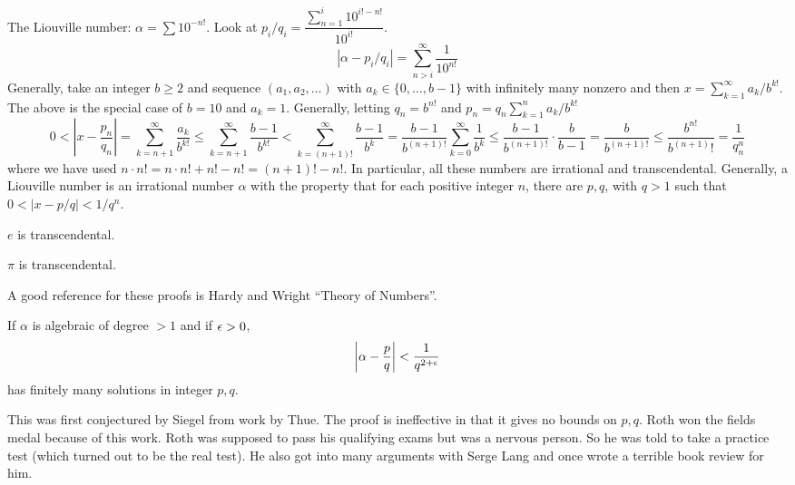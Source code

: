 \begin{ex}
The Liouville number: $\alpha= \sum 10^{-n!}$. Look at $p_i/q_i=\dfrac{\sum_{n=1}^i 10^{i!-n!}}{10^{i!}}$. 
	\[
	|\alpha - p_i/q_i| = \sum_{n>i}^\infty \dfrac{1}{10^{n!}} 
	\]
Generally, take an integer $b \geq 2$ and sequence $(a_1,a_2,\ldots)$ with $a_k \in \{0,\ldots,b-1\}$ with infinitely many nonzero and then $x= \sum_{k=1}^\infty a_k/b^{k!}$. The above is the special case of $b=10$ and $a_k=1$. Generally, letting $q_n=b^{n!}$ and $p_n=q_n \sum_{k=1}^n a_k/b^{k!}$
	\[
	0<\left| x- \dfrac{p_n}{q_n}\right| = \sum_{k=n+1}^\infty \dfrac{a_k}{b^{k!}} \leq \sum_{k=n+1}^\infty \dfrac{b-1}{b^{k!}} < \sum_{k=(n+1)!}^\infty \dfrac{b-1}{b^k} = \dfrac{b-1}{b^{(n+1)!}} \sum_{k=0}^\infty \dfrac{1}{b^k} \leq \dfrac{b-1}{b^{(n+1)!}} \cdot \dfrac{b}{b-1}= \dfrac{b}{b^{(n+1)!}} \leq \dfrac{b^{n!}}{b^(n+1)!} = \dfrac{1}{q_n^n}
	\]
where we have used $n \cdot n!=n \cdot n! + n! - n! = (n+1)!-n!$. In particular, all these numbers are irrational and transcendental. Generally, a Liouville number is an irrational number $\alpha$ with the property that for each positive integer $n$, there are $p,q$, with $q>1$ such that $0<|x-p/q|< 1/q^n$.
\end{ex}

\begin{thm}[Hermite, 1878]
$e$ is transcendental. 
\end{thm}

\begin{thm}[Lindemann, 1882]
$\pi$ is transcendental. 
\end{thm}

A good reference for these proofs is Hardy and Wright ``Theory of Numbers''. 

\begin{thm}
If $\alpha$ is algebraic of degree $>1$ and if $\epsilon>0$, 
	\[
	\left| \alpha - \dfrac{p}{q} \right| < \dfrac{1}{q^{2+\epsilon}}
	\]
has finitely many solutions in integer $p,q$.
\end{thm}

\tb This was first conjectured by Siegel from work by Thue. The proof is ineffective in that it gives no bounds on $p,q$. Roth won the fields medal because of this work. Roth was supposed to pass his qualifying exams but was a nervous person. So he was told to take a practice test (which turned out to be the real test). He also got into many arguments with Serge Lang and once wrote a terrible book review for him. \\


